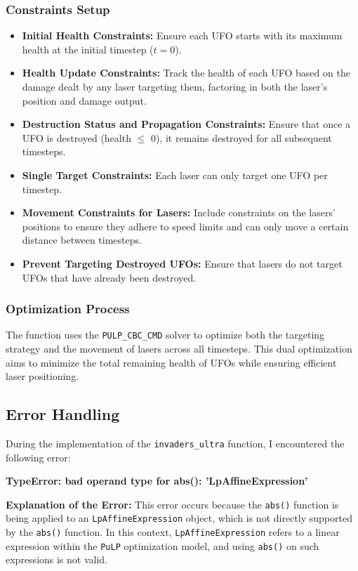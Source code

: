 \documentclass[12pt]{article}
\begin{document}
\subsubsection{Constraints Setup}
\begin{itemize}
    \item \textbf{Initial Health Constraints:} Ensure each UFO starts with its maximum health at the initial timestep ($t = 0$).
    \item \textbf{Health Update Constraints:} Track the health of each UFO based on the damage dealt by any laser targeting them, factoring in both the laser's position and damage output.
    \item \textbf{Destruction Status and Propagation Constraints:} Ensure that once a UFO is destroyed (health $\leq$ 0), it remains destroyed for all subsequent timesteps.
    \item \textbf{Single Target Constraints:} Each laser can only target one UFO per timestep.
    \item \textbf{Movement Constraints for Lasers:} Include constraints on the lasers' positions to ensure they adhere to speed limits and can only move a certain distance between timesteps.
    \item \textbf{Prevent Targeting Destroyed UFOs:} Ensure that lasers do not target UFOs that have already been destroyed.
\end{itemize}

\subsubsection{Optimization Process}
The function uses the \texttt{PULP\_CBC\_CMD} solver to optimize both the targeting strategy and the movement of lasers across all timesteps. This dual optimization aims to minimize the total remaining health of UFOs while ensuring efficient laser positioning.

\subsection{Error Handling}
During the implementation of the \texttt{invaders\_ultra} function, I encountered the following error:

\textbf{TypeError: bad operand type for abs(): 'LpAffineExpression'}

\textbf{Explanation of the Error:} This error occurs because the \texttt{abs()} function is being applied to an \texttt{LpAffineExpression} object, which is not directly supported by the \texttt{abs()} function. In this context, \texttt{LpAffineExpression} refers to a linear expression within the \texttt{PuLP} optimization model, and using \texttt{abs()} on such expressions is not valid.
\end{document}
